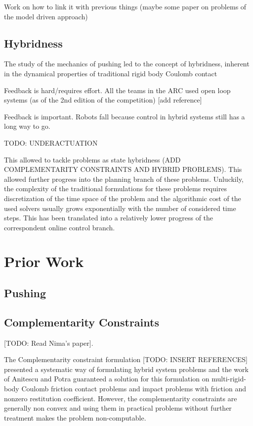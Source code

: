 \documentclass[12,twoside]{TFG-GM}
\theoremstyle{definition}
\theoremstyle{remark}
\begin{document}
Work on how to link it with previous things (maybe some paper on problems of the model driven approach)

\subsection{Hybridness}
\label{subsec:hybridness}

The study of the mechanics of pushing led to the concept of hybridness, inherent in the dynamical properties of traditional rigid body Coulomb contact  

Feedback is hard/requires effort. All the teams in the ARC used open loop systems (as of the 2nd edition of the competition) [add reference]

Feedback is important. Robots fall because control in hybrid systems still has a long way to go.

TODO: UNDERACTUATION


This allowed to tackle problems as state hybridness (ADD COMPLEMENTARITY CONSTRAINTS AND HYBRID PROBLEMS). This allowed further progress into the planning branch of these problems. Unluckily, the complexity of the traditional formulations for these problems requires discretization of the time space of the problem and the algorithmic cost of the used solvers usually grows exponentially with the number of considered time steps. This has been translated into a relatively lower progress of the correspondent online control branch.

\section{Prior Work}
\label{sec:priorWork}

\subsection{Pushing}
\label{subsec:pushing}



\subsection{Complementarity Constraints}
\label{subsec:Complementarity Constraint}
[TODO: Read Nima's paper].

The Complementarity constraint formulation [TODO: INSERT REFERENCES] presented a systematic way of formulating hybrid system problems and the work of Anitescu and Potra \cite{lcc1} guaranteed a solution for this formulation on multi-rigid-body Coulomb friction contact problems and impact problems with friction and nonzero restitution coefficient. However, the complementarity constraints are generally non convex and using them in practical problems without further treatment makes the problem non-computable.
\end{document}
